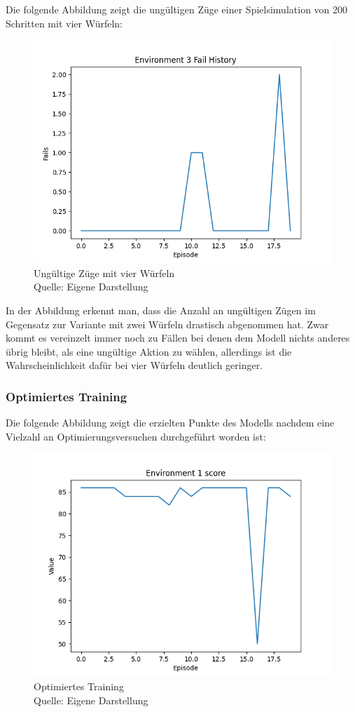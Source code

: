 Die folgende Abbildung zeigt die ungültigen Züge einer Spielsimulation von 200 Schritten mit vier Würfeln:
\nopagebreak
\begin{figure}[H]
	\includegraphics[width=1\textwidth]{Bilder/failswithfourdice} 
	\caption[Ungültige Züge mit vier Würfeln]{Ungültige Züge mit vier Würfeln\\ Quelle: Eigene Darstellung}
\end{figure}

In der Abbildung erkennt man, dass die Anzahl an ungültigen Zügen im Gegensatz zur Variante mit zwei Würfeln drastisch abgenommen hat. Zwar kommt es vereinzelt immer noch zu Fällen bei denen dem Modell nichts anderes übrig bleibt, als eine ungültige Aktion zu wählen, allerdings ist die Wahrscheinlichkeit dafür bei vier Würfeln deutlich geringer.
\subsubsection{Optimiertes Training}
Die folgende Abbildung zeigt die erzielten Punkte des Modells nachdem eine Vielzahl an Optimierungsversuchen durchgeführt worden ist:
\nopagebreak
\begin{figure}[H]
	\includegraphics[width=1\textwidth]{Bilder/optimizetraining} 
	\caption[Optimiertes Training]{Optimiertes Training\\ Quelle: Eigene Darstellung}
\end{figure}

